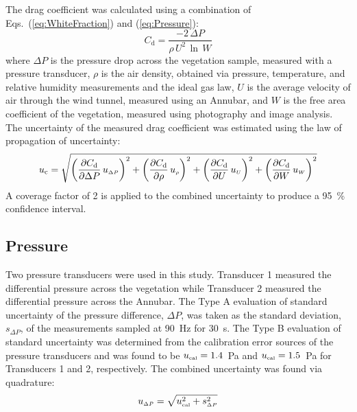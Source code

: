 \documentclass[12pt]{article}
\begin{document}
The drag coefficient was calculated using a combination of Eqs.~(\ref{eq:WhiteFraction}) and (\ref{eq:Pressure}):
\begin{equation}\label{eq:drag_coefficient}
  C_\mathrm{d} = \frac{-2 \, \Delta P}{\rho \, U^2 \, \ln \, W}
\end{equation}
where $\Delta P$ is the pressure drop across the vegetation sample, measured with a pressure transducer, $\rho$ is the air density, obtained via pressure, temperature, and relative humidity measurements and the ideal gas law, $U$ is the average velocity of air through the wind tunnel, measured using an Annubar, and $W$ is the free area coefficient of the vegetation, measured using photography and image analysis. The uncertainty of the measured drag coefficient was estimated using the law of propagation of uncertainty:
\begin{equation}
\label{eq:DragUncertainty}
u_\mathrm{c} = \sqrt{{\left( \frac{\partial C_{\rm d}}{\partial \Delta P}\,u_{\scriptscriptstyle \Delta P} \right)}^2+{\left(\frac{\partial C_{\rm d}}{\partial \rho}\,u_{\scriptscriptstyle \rho}\right)}^2+{\left(\frac{\partial C_{\rm d}}{\partial U}\,u_{\scriptscriptstyle U}\right)}^2+{\left(\frac{\partial C_{\rm d}}{\partial W}\,u_{\scriptscriptstyle W}\right)}^2}
\end{equation}
A coverage factor of 2 is applied to the combined uncertainty to produce a 95~\% confidence interval.


\subsection{Pressure}
\label{ssec:PressUncertainty}

Two pressure transducers were used in this study. Transducer 1 measured the differential pressure across the vegetation while Transducer 2 measured the differential pressure across the Annubar. The Type A evaluation of standard uncertainty of the pressure difference, $\Delta P$, was taken as the standard deviation, $s_{\scriptscriptstyle \Delta P}$, of the measurements sampled at 90~\si{Hz} for 30~\si{s}. The Type B evaluation of standard uncertainty was determined from the calibration error sources of the pressure transducers and was found to be $u_{\rm \scriptscriptstyle cal}=1.4$~Pa and $u_{\rm \scriptscriptstyle cal}=1.5$~Pa for Transducers 1 and 2, respectively. The combined uncertainty was found via quadrature:
\begin{equation}
\label{eq:pressureuncertainty}
u_{\scriptscriptstyle \Delta P} = \sqrt{ u_{\rm \scriptscriptstyle cal}^2 + s_{\scriptscriptstyle \Delta P}^2}
\end{equation}
\end{document}
